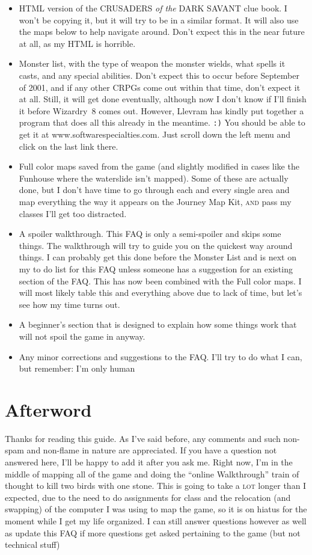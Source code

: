 \documentclass[11pt,twoside,openright]{report}
\DeclareRobustCommand{\indexPlace}[1]{\index[places]{#1}}
\DeclareRobustCommand{\placeB}[2]{\texorpdfstring{#1\indexPlace{#2}}{#1}}
\newcommand\textlcsc[1]{\texorpdfstring{\textsc{\MakeLowercase{#1}}}{#1}}
\DeclareRobustCommand{\CotDS}{%
  {\addfontfeature{StylisticSet=2}\uppercase{Crusaders} {\fontspec{EB Garamond}\textit{of the}} \uppercase{Dark Savant}}}
\begin{document}
\begin{itemize}
\item
  HTML version of the \CotDS{} clue book. I won't be copying it, but
  it will try to be in a similar format. It will also use the maps below
  to help navigate around. Don't expect this in the near future at all,
  as my HTML is horrible.
\item
  Monster list, with the type of weapon the monster wields, what spells
  it casts, and any special abilities. Don't expect this to occur before
  September of 2001, and if any other CRPGs come out within that time,
  don't expect it at all. Still, it will get done eventually, although
  now I don't know if I'll finish it before Wizardry~8 comes out.
  However, Llevram has kindly put together a program that does all this
  already in the meantime. \verb|:)| You should be able to get it at
  www.softwarespecialties.com. Just scroll down the left menu and click
  on the last link there.
\item
  Full color maps saved from the game (and slightly modified in cases like
  the \placeB{Funhouse}{Rattkin Funhouse} where the waterslide isn't
  mapped). Some of these are actually done, but I don't have time to go
  through each and every single area and map everything the way it appears on
  the Journey Map Kit, \textlcsc{AND} pass my classes I'll get too
  distracted.
\item
  A spoiler walkthrough. This FAQ is only a semi-spoiler and skips some
  things. The walkthrough will try to guide you on the quickest way
  around things. I can probably get this done before the Monster List
  and is next on my to do list for this FAQ unless someone has a
  suggestion for an existing section of the FAQ. This has now been
  combined with the Full color maps. I will most likely table this and
  everything above due to lack of time, but let's see how my time turns
  out.
\item
  A beginner's section that is designed to explain how some things work
  that will not spoil the game in anyway.
\item
  Any minor corrections and suggestions to the FAQ. I'll try to do what
  I can, but remember: I'm only human
\end{itemize}

\section{Afterword}\label{afterword}
%
Thanks for reading this guide. As I've said before, any comments and such
non-spam and non-flame in nature are appreciated. If you have a question not
answered here, I'll be happy to add it after you ask me.  Right now, I'm in
the middle of mapping all of the game and doing the ``online Walkthrough''
train of thought to kill two birds with one stone. This is going to take a
\textlcsc{LOT} longer than I expected, due to the need to do assignments for
class and the relocation (and swapping) of the computer I was using to map
the game, so it is on hiatus for the moment while I get my life organized. I
can still answer questions however as well as update this FAQ if more
questions get asked pertaining to the game (but not technical stuff)

\clearpage
\printindex

\printindex[monsters]

\printindex[npcs]

\printindex[places]

\printindex[spells]

\printindex[items]
\end{document}
